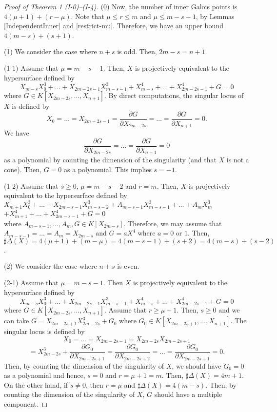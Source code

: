 \documentclass[10pt,oneside]{amsart}
\theoremstyle{definition}
\begin{document}
\begin{proof}[Proof of Theorem 1 (I-0)--(I-4)] 
(0) 
Now, the number of inner Galois points is $4(\mu+1)+(r-\mu)$. 
Note that $\mu \le r \le m$ and $\mu \le m-s-1$, by Lemmas \ref{IndependentInner} and \ref{restrict-mu}. 
Therefore, we have an upper bound $4(m-s)+(s+1)$. 

(1) We consider the case where $n+s$ is odd. 
Then, $2m-s=n+1$. 

(1-1) Assume that $\mu=m-s-1$.  
Then, $X$ is projectively equivalent to the hypersurface defined by 
$$X_{m-s}X_0^3+\dots+X_{2m-2s-1}X_{m-s-1}^3+X_{m-s}^4+\dots+X_{2m-2s-1}^4+G=0$$ where $G \in K[X_{2m-2s}, \ldots, X_{n+1}]$. 
By direct computations, the singular locus of $X$ is defined by
$$ X_0=\dots=X_{2m-2s-1}=\frac{\partial G}{\partial X_{2m-2s}}=\dots=\frac{\partial G}{\partial X_{n+1}}=0. $$
We have 
$$ \frac{\partial G}{\partial X_{2m-2s}}=\dots=\frac{\partial G}{\partial X_{n+1}}=0 $$
as a polynomial by counting the dimension of the singularity (and that $X$ is not a cone). 
Then, $G=0$ as a polynomial. 
This implies $s=-1$. 

(1-2) Assume that $s \ge 0$, $\mu=m-s-2$ and $r=m$. 
Then, $X$ is projectively equivalent to the hypersurface defined by \\
 $X_{m+1}X_0^3+\dots+X_{2m-s-1}X_{m-s-2}^3+A_{m-s-1}X_{m-s-1}^3+\dots+A_mX_m^3$ \\
\hspace{80mm} $+X_{m+1}^4+\dots+X_{2m-s-1}^4+G =0 $ \\
where $A_{m-s-1}, \ldots, A_m, G \in K[X_{2m-s}]$. 
Therefore, we may assume that $A_{m-s-1}=\dots=A_m=X_{2m-s}$ and $G=aX^4$ where $a=0$ or $1$. 
Then, $\sharp\Delta(X)=4(\mu+1)+(m-\mu)=4(m-s-1)+(s+2)=4(m-s)+(s-2)$. 

(2) We consider the case where $n+s$ is even. 

(2-1) Assume that $\mu=m-s-1$. 
Then $X$ is projectively equivalent to the hypersurface defined by 
$$X_{m-s}X_0^3+\dots+X_{2m-2s-1}X_{m-s-1}^3+X_{m-s}^4+\dots+X_{2m-2s-1}^4+G=0$$  
where $G \in K[X_{2m-2s}, \ldots, X_{n+1}]$. 
Assume that $r \ge \mu+1$. 
Then, $s \ge 0$ and we can take $G=X_{2m-2s+1}X_{2m-2s}^3+G_0$ where $G_0 \in K[X_{2m-2s+1}, \ldots, X_{n+1}]$. 
The singular locus is defined by 
$$ X_{0}=\dots=X_{2m-2s-1}=X_{2m-2s}X_{2m-2s+1}$$ 
$$=X_{2m-2s}^3+\frac{\partial G_0}{\partial X_{2m-2s+1}}=\frac{\partial G_0}{\partial X_{2m-2s+2}}=\dots=\frac{\partial G_0}{\partial X_{2m-2s+1}}=0. $$
Then, by counting the dimension of the singularity of $X$, we should have $G_0=0$ as a polynomial and hence, $s=0$ and $r=\mu+1=m$. 
Then, $\sharp\Delta(X)=4m+1$. 
On the other hand, if $s \ne 0$, then $r = \mu$  and $\sharp\Delta(X)=4(m-s)$. 
Then, by counting the dimension of the singularity of $X$, $G$ should have a multiple component. 


\end{proof}
\end{document}
